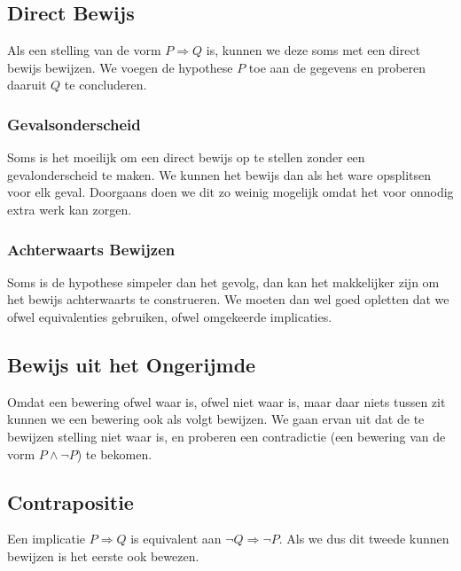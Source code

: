 \documentclass[lineaire_algebra_oplossingen.tex]{subfiles}
\begin{document}
\subsection{Direct Bewijs}
Als een stelling van de vorm $P \Rightarrow Q$ is, kunnen we deze soms met een direct bewijs bewijzen. We voegen de hypothese $P$ toe aan de gegevens en proberen daaruit $Q$ te concluderen. 

\subsubsection{Gevalsonderscheid}
Soms is het moeilijk om een direct bewijs op te stellen zonder een gevalonderscheid te maken. We kunnen het bewijs dan als het ware opsplitsen voor elk geval. Doorgaans doen we dit zo weinig mogelijk omdat het voor onnodig extra werk kan zorgen.

\subsubsection{Achterwaarts Bewijzen}
Soms is de hypothese simpeler dan het gevolg, dan kan het makkelijker zijn om het bewijs achterwaarts te construeren. We moeten dan wel goed opletten dat we ofwel equivalenties gebruiken, ofwel omgekeerde implicaties.

\subsection{Bewijs uit het Ongerijmde}
Omdat een bewering ofwel waar is, ofwel niet waar is, maar daar niets tussen zit kunnen we een bewering ook als volgt bewijzen. We gaan ervan uit dat de te bewijzen stelling niet waar is, en proberen een contradictie (een bewering van de vorm $P\wedge\neg P$) te bekomen.

\subsection{Contrapositie}
Een implicatie $P\Rightarrow Q$ is equivalent aan $\neg Q\Rightarrow \neg P$. Als we dus dit tweede kunnen bewijzen is het eerste ook bewezen.
\end{document}
